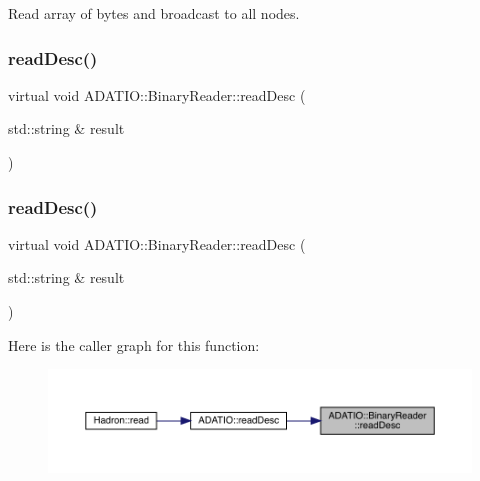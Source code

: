 Read array of bytes and broadcast to all nodes. 

\mbox{\label{classADATIO_1_1BinaryReader_a70de2f31f59d9846f4ee688c3590bf31}} 
\subsubsection{\texorpdfstring{readDesc()}{readDesc()}\hspace{0.1cm}{\footnotesize\ttfamily [1/2]}}
{\footnotesize\ttfamily virtual void A\+D\+A\+T\+I\+O\+::\+Binary\+Reader\+::read\+Desc (\begin{DoxyParamCaption}\item[{std\+::string \&}]{result }\end{DoxyParamCaption})\hspace{0.3cm}{\ttfamily [virtual]}}

\mbox{\label{classADATIO_1_1BinaryReader_a70de2f31f59d9846f4ee688c3590bf31}} 
\subsubsection{\texorpdfstring{readDesc()}{readDesc()}\hspace{0.1cm}{\footnotesize\ttfamily [2/2]}}
{\footnotesize\ttfamily virtual void A\+D\+A\+T\+I\+O\+::\+Binary\+Reader\+::read\+Desc (\begin{DoxyParamCaption}\item[{std\+::string \&}]{result }\end{DoxyParamCaption})\hspace{0.3cm}{\ttfamily [virtual]}}

Here is the caller graph for this function\+:\nopagebreak
\begin{figure}[H]
\begin{center}
\leavevmode
\includegraphics[width=350pt]{da/dd9/classADATIO_1_1BinaryReader_a70de2f31f59d9846f4ee688c3590bf31_icgraph}
\end{center}
\end{figure}
\mbox{\label{classADATIO_1_1BinaryReader_aeb7e739afca615aff19646e64b8da320}} 
